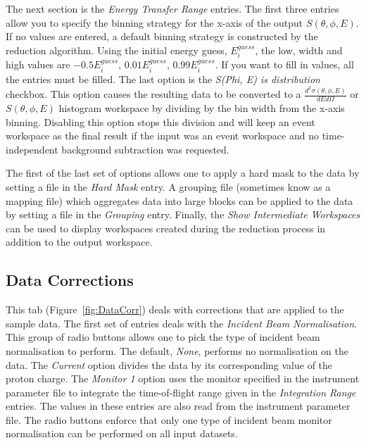 The next section is the \textit{Energy Transfer Range} entries. The first three entries allow you to specify the binning strategy for the x-axis of the output $S(\theta, \phi, E)$. If no values are entered, a default binning strategy is constructed by the reduction algorithm. Using the initial energy guess, $E^{guess}_i$, the low, width and high values are $-0.5E^{guess}_i$, $0.01E^{guess}_i$, $0.99E^{guess}_i$. If you want to fill in values, all the entries must be filled. The last option is the \textit{S(Phi, E) is distribution} checkbox. This option causes the resulting data to be converted to a $\frac{d^2\sigma(\theta,\phi,E)}{dE d\Omega}$ or $S(\theta, \phi, E)$ histogram workspace by dividing by the bin width from the x-axis binning. Disabling this option stops this division and will keep an event workspace as the final result if the input was an event workspace and no time-independent background subtraction was requested. 

The first of the last set of options allows one to apply a hard mask to the data by setting a file in the \textit{Hard Mask} entry. A grouping file (sometimes know as a mapping file) which aggregates data into large blocks can be applied to the data by setting a file in the \textit{Grouping} entry. Finally, the \textit{Show Intermediate Workspaces} can be used to display workspaces created during the reduction process in addition to the output workspace. 
\subsection{Data Corrections}
This tab (Figure~\ref{fig:DataCorr}) deals with corrections that are applied to the sample data. The first set of entries deals with the \textit{Incident Beam Normalisation}. This group of radio buttons allows one to pick the type of incident beam normalisation to perform. The default, \textit{None}, performs no normalisation on the data. The \textit{Current} option divides the data by its corresponding value of the proton charge. The \textit{Monitor 1} option uses the monitor specified in the instrument parameter file to integrate the time-of-flight range given in the \textit{Integration Range} entries. The values in these entries are also read from the instrument parameter file. The radio buttons enforce that only one type of incident beam monitor normalisation can be performed on all input datasets.

